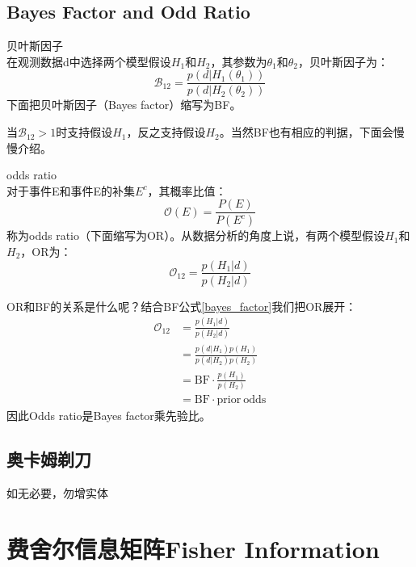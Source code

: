 \subsection{Bayes Factor and Odd Ratio}
\begin{definition}{贝叶斯因子\\}
    在观测数据d中选择两个模型假设$H_1$和$H_2$，其参数为$\theta_1$和$\theta_2$，贝叶斯因子为：
    \begin{equation}
        \mathcal{B}_{12}=\frac{p(d|H_1(\theta_1))}{p(d|H_2(\theta_2))} \label{bayes_factor}
    \end{equation}
    下面把贝叶斯因子（Bayes factor）缩写为BF。
\end{definition}
当$\mathcal{B}_{12}>1$时支持假设$H_1$，反之支持假设$H_2$。当然BF也有相应的判据，下面会慢慢介绍。
\begin{definition}{odds ratio\\}
    对于事件E和事件E的补集$E^c$，其概率比值：
    \begin{equation}
        \mathcal{O}(E)=\frac{P(E)}{P(E^c)}
    \end{equation}
    称为\textrm{odds ratio}（下面缩写为OR）。从数据分析的角度上说，有两个模型假设$H_1$和$H_2$，OR为：
    \begin{equation}
        \mathcal{O}_{12}=\frac{p(H_1|d)}{p(H_2|d)} \label{ORs}
    \end{equation}
\end{definition}
OR和BF的关系是什么呢？结合BF公式\ref{bayes_factor}我们把OR展开：
\begin{equation}
    \begin{aligned}
        \mathcal{O}_{12} &= \frac{p(H_1|d)}{p(H_2|d)}\\
        &= \frac{p(d|H_1)p(H_1)}{p(d|H_2)p(H_2)}\\
        &= \mathrm{BF}\cdot\frac{p(H_1)}{p(H_2)}\\
        &= \mathrm{BF}\cdot \mathrm{prior\ odds}
    \end{aligned}
\end{equation}
因此Odds ratio是Bayes factor乘先验比。\\




\subsection{奥卡姆剃刀}
如无必要，勿增实体
\section{费舍尔信息矩阵Fisher Information}